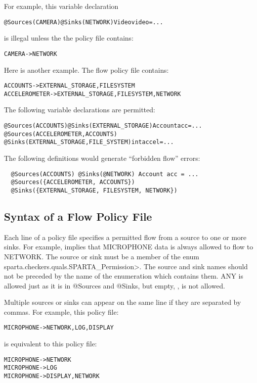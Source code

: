 For example, this variable declaration

\begin{alltt}
@Sources(CAMERA) @Sinks(NETWORK) Video video = ...
\end{alltt}

\noindent
is illegal unless the the policy file contains:

\begin{alltt}
CAMERA -> NETWORK
\end{alltt}

Here is another example.
The flow policy file contains:
\begin{alltt}
  ACCOUNTS      -> EXTERNAL_STORAGE, FILESYSTEM
  ACCELEROMETER -> EXTERNAL_STORAGE, FILESYSTEM, NETWORK
\end{alltt}

The following variable declarations are permitted:
\begin{alltt}
  @Sources(ACCOUNTS) @Sinks(EXTERNAL_STORAGE) Account acc = ...
  @Sources({ACCELEROMETER, ACCOUNTS})
  @Sinks({EXTERNAL_STORAGE, FILE_SYSTEM}) int accel = ...
\end{alltt}

The following definitions would generate ``forbidden flow'' errors:
\begin{Verbatim}
  @Sources(ACCOUNTS) @Sinks(@NETWORK) Account acc = ...
  @Sources({ACCELEROMETER, ACCOUNTS})
  @Sinks({EXTERNAL_STORAGE, FILESYSTEM, NETWORK})
\end{Verbatim}


\subsection{Syntax of a Flow Policy File}

Each line of a policy file specifies a permitted flow from a source to one
or more sinks.  For example,
 implies that
MICROPHONE data is always allowed to flow to NETWORK.
The source or sink must be a member of the enum
\<sparta.checkers.quals.SPARTA\_Permission>.  The source 
and sink names should not be preceded by the name of the enumeration which contains them.
ANY is allowed just as it is in @Sources and @Sinks, but empty, \ttcbs, is not allowed.

Multiple sources or sinks can appear on the same line if they are separated by commas. 
For example,
this policy file:
\begin{alltt}
   MICROPHONE -> NETWORK, LOG, DISPLAY
\end{alltt}
is equivalent to this policy file:
\begin{alltt}
   MICROPHONE -> NETWORK
   MICROPHONE -> LOG
   MICROPHONE -> DISPLAY, NETWORK
\end{alltt}

